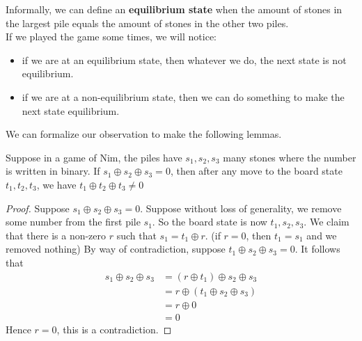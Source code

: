 Informally, we can define an \textbf{equilibrium state} when the amount of stones in the largest pile equals the amount of stones in the other two piles.\\

If we played the game some times, we will notice:
\begin{itemize}
    \item if we are at an equilibrium state, then whatever we do, the next state is not equilibrium.
    \item if we are at a non-equilibrium state, then we can do something to make the next state equilibrium.
\end{itemize}
We can formalize our observation to make the following lemmas.

\begin{lemma}
    Suppose in a game of Nim, the piles have $s_1,s_2,s_3$ many stones where the number is written in binary. 
    If $s_1 \oplus s_2 \oplus s_3=0$, then after any move to the board state $t_1,t_2,t_3$, we have $t_1 \oplus t_2 \oplus t_3 \neq 0$
\end{lemma}
\begin{proof}
    Suppose $s_1 \oplus s_2 \oplus s_3=0$. 
    Suppose without loss of generality, we remove some number from the first pile $s_1$. 
    So the board state is now $t_1,s_2,s_3$. 
    We claim that there is a non-zero $r$ such that $s_1=t_1 \oplus r$. 
    (if $r=0$, then $t_1=s_1$ and we removed nothing) 
    By way of contradiction, suppose $t_1 \oplus s_2 \oplus s_3=0$.
    It follows that 
    \begin{equation}
        \begin{split}
            s_1 \oplus s_2 \oplus s_3 &= (r \oplus t_1) \oplus s_2 \oplus s_3\\
            &= r \oplus (t_1 \oplus s_2 \oplus s_3)\\
            &= r \oplus 0\\
            &= 0
        \end{split}
    \end{equation}
    Hence $r=0$, this is a contradiction.
\end{proof}



